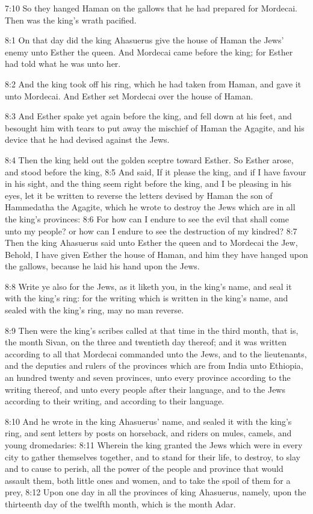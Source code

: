 7:10 So they hanged Haman on the gallows that he had prepared for Mordecai. Then was the king's wrath pacified.

8:1 On that day did the king Ahasuerus give the house of Haman the Jews' enemy unto Esther the queen. And Mordecai came before the king; for Esther had told what he was unto her.

8:2 And the king took off his ring, which he had taken from Haman, and gave it unto Mordecai. And Esther set Mordecai over the house of Haman.

8:3 And Esther spake yet again before the king, and fell down at his feet, and besought him with tears to put away the mischief of Haman the Agagite, and his device that he had devised against the Jews.

8:4 Then the king held out the golden sceptre toward Esther. So Esther arose, and stood before the king, 8:5 And said, If it please the king, and if I have favour in his sight, and the thing seem right before the king, and I be pleasing in his eyes, let it be written to reverse the letters devised by Haman the son of Hammedatha the Agagite, which he wrote to destroy the Jews which are in all the king's provinces: 8:6 For how can I endure to see the evil that shall come unto my people?  or how can I endure to see the destruction of my kindred?  8:7 Then the king Ahasuerus said unto Esther the queen and to Mordecai the Jew, Behold, I have given Esther the house of Haman, and him they have hanged upon the gallows, because he laid his hand upon the Jews.

8:8 Write ye also for the Jews, as it liketh you, in the king's name, and seal it with the king's ring: for the writing which is written in the king's name, and sealed with the king's ring, may no man reverse.

8:9 Then were the king's scribes called at that time in the third month, that is, the month Sivan, on the three and twentieth day thereof; and it was written according to all that Mordecai commanded unto the Jews, and to the lieutenants, and the deputies and rulers of the provinces which are from India unto Ethiopia, an hundred twenty and seven provinces, unto every province according to the writing thereof, and unto every people after their language, and to the Jews according to their writing, and according to their language.

8:10 And he wrote in the king Ahasuerus' name, and sealed it with the king's ring, and sent letters by posts on horseback, and riders on mules, camels, and young dromedaries: 8:11 Wherein the king granted the Jews which were in every city to gather themselves together, and to stand for their life, to destroy, to slay and to cause to perish, all the power of the people and province that would assault them, both little ones and women, and to take the spoil of them for a prey, 8:12 Upon one day in all the provinces of king Ahasuerus, namely, upon the thirteenth day of the twelfth month, which is the month Adar.

